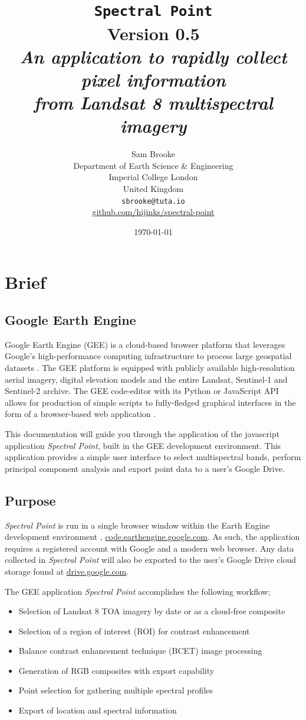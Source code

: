 \documentclass[12pt]{article}
\author{Sam Brooke\\
  Department of Earth Science \& Engineering\\
  Imperial College London\\ 
  United Kingdom \\
  \texttt{sbrooke@tuta.io}\\
  \href{https://github.com/hijinks/spectral-point}{github.com/hijinks/spectral-point}}
\date{\today}
\title{\Huge\texttt{Spectral Point}\\\Large{Version 0.5}\\\vspace{2em}\textit{\normalsize{An application to rapidly collect pixel information\\ from Landsat 8 multispectral imagery}}}
\begin{document}
\maketitle

\newpage

\section{Brief}

\subsection{Google Earth Engine}

Google Earth Engine (GEE) is a cloud-based browser platform that leverages Google’s high-performance computing infrastructure to process large geospatial datasets \citep{Gorelick2017}. The GEE platform is equipped with publicly available high-resolution aerial imagery, digital elevation models and the entire Landsat, Sentinel-1 and Sentinel-2 archive. The GEE code-editor with its Python or JavaScript API allows for production of simple scripts to fully-fledged graphical interfaces in the form of a browser-based web application \citep{Gorelick2017}.

This documentation will guide you through the application of the javascript application \textit{Spectral Point}, built in the GEE development environment. This application provides a simple user interface to select multispectral bands, perform principal component analysis and export point data to a user's Google Drive.

\subsection{Purpose}

\textit{Spectral Point} is run in a single browser window within the Earth Engine development environment \citep{Gorelick2017}, \href{https://code.earthengine.google.com}{code.earthengine.google.com}. As such, the application requires a registered account with Google and a modern web browser. Any data collected in \textit{Spectral Point} will also be exported to the user's Google Drive cloud storage found at \href{https://drive.google.com}{drive.google.com}.

The GEE application \textit{Spectral Point} accomplishes the following workflow;

\begin{itemize}
  \item Selection of Landsat 8 TOA imagery by date or as a cloud-free composite
  \item Selection of a region of interest (ROI) for contrast enhancement
  \item Balance contrast enhancement technique (BCET) image processing
  \item Generation of RGB composites with export capability
  \item Point selection for gathering multiple spectral profiles
  \item Export of location and spectral information
\end{itemize}
\end{document}

